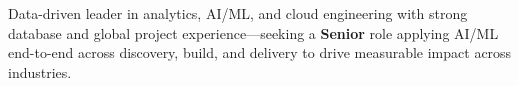 
Data-driven leader in analytics, AI/ML, and cloud engineering with strong database and global project experience—seeking a \textbf{Senior} role applying AI/ML end-to-end across discovery, build, and delivery to drive measurable impact across industries.
